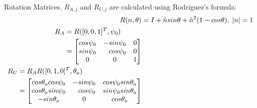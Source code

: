 Rotation Matrices. $R_{A,j}$ and $R_{U,j}$ are calculated using Rodriguez's formula:
\begin{align}
R(n,\theta)&=I+\tilde{n} sin\theta +\tilde{n}^2(1-cos\theta), \; |n|=1 \\
\begin{split}
 R_{A} &= R([0,0,1]^T,\psi_{0})  \\
         &=\begin{bmatrix}
         cos\psi_0 & -sin\psi_0 & 0 \\
         sin\psi_0 & \hphantom{-}cos\psi_0 & 0 \\
         0 & 0 & 1
         \end{bmatrix} \end{split} \\
\begin{split}
 R_{U} &= R_{A}R([0,1,0]^T,\theta_{a}) \\
         &=\begin{bmatrix}
        cos\theta_a  cos\psi_0 & -sin\psi_0 & cos\psi_0 sin\theta_a \\
         cos\theta_a sin\psi_0 & \hphantom{-} cos\psi_0 & sin\psi_0 sin\theta_a\\
         -sin\theta_a & 0 & cos\theta_a 
         \end{bmatrix}    
\end{split} 
\end{align}

